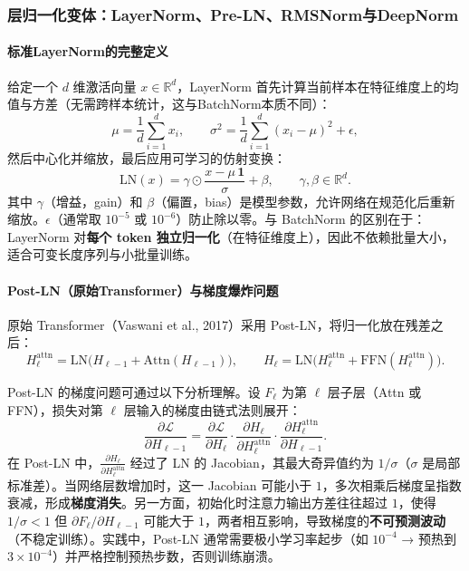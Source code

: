 \documentclass[12pt,a4paper]{article}
\begin{document}
\subsubsection{层归一化变体：LayerNorm、Pre-LN、RMSNorm与DeepNorm}
\label{sec:layernorm}

\paragraph{标准LayerNorm的完整定义}

给定一个 $d$ 维激活向量 $x \in \mathbb{R}^d$，LayerNorm 首先计算当前样本在特征维度上的均值与方差（无需跨样本统计，这与BatchNorm本质不同）：
\begin{equation}
\mu = \frac{1}{d}\sum_{i=1}^d x_i, \qquad \sigma^2 = \frac{1}{d}\sum_{i=1}^d (x_i - \mu)^2 + \epsilon,
\end{equation}
然后中心化并缩放，最后应用可学习的仿射变换：
\begin{equation}
\mathrm{LN}(x) = \gamma \odot \frac{x - \mu\,\mathbf{1}}{\sigma} + \beta,\qquad \gamma, \beta \in \mathbb{R}^d.
\end{equation}
其中 $\gamma$（增益，gain）和 $\beta$（偏置，bias）是模型参数，允许网络在规范化后重新缩放。$\epsilon$（通常取 $10^{-5}$ 或 $10^{-6}$）防止除以零。与 BatchNorm 的区别在于：LayerNorm 对\textbf{每个 token 独立归一化}（在特征维度上），因此不依赖批量大小，适合可变长度序列与小批量训练。

\paragraph{Post-LN（原始Transformer）与梯度爆炸问题}

原始 Transformer（Vaswani et al., 2017）采用 Post-LN，将归一化放在残差之后：
\begin{equation}
H_\ell^{\mathrm{attn}} = \mathrm{LN}\!\bigl(H_{\ell-1} + \mathrm{Attn}(H_{\ell-1})\bigr),\qquad
H_\ell = \mathrm{LN}\!\bigl(H_\ell^{\mathrm{attn}} + \mathrm{FFN}(H_\ell^{\mathrm{attn}})\bigr).
\end{equation}

Post-LN 的梯度问题可通过以下分析理解。设 $F_\ell$ 为第 $\ell$ 层子层（Attn 或 FFN），损失对第 $\ell$ 层输入的梯度由链式法则展开：
\begin{equation}
\frac{\partial \mathcal{L}}{\partial H_{\ell-1}} = \frac{\partial \mathcal{L}}{\partial H_\ell} \cdot \frac{\partial H_\ell}{\partial H_\ell^{\mathrm{attn}}} \cdot \frac{\partial H_\ell^{\mathrm{attn}}}{\partial H_{\ell-1}}.
\end{equation}
在 Post-LN 中，$\frac{\partial H_\ell}{\partial H_\ell^{\mathrm{attn}}}$ 经过了 LN 的 Jacobian，其最大奇异值约为 $1/\sigma$（$\sigma$ 是局部标准差）。当网络层数增加时，这一 Jacobian 可能小于 $1$，多次相乘后梯度呈指数衰减，形成\textbf{梯度消失}。另一方面，初始化时注意力输出方差往往超过 $1$，使得 $1/\sigma < 1$ 但 $\partial F_\ell/\partial H_{\ell-1}$ 可能大于 $1$，两者相互影响，导致梯度的\textbf{不可预测波动}（不稳定训练）。实践中，Post-LN 通常需要极小学习率起步（如 $10^{-4}$ → 预热到 $3\times10^{-4}$）并严格控制预热步数，否则训练崩溃。
\end{document}
